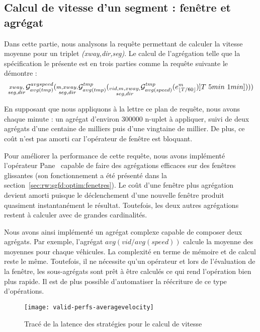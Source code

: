 \subsection{Calcul de vitesse d'un segment : fenêtre et agrégat}
Dans cette partie, nous analysons la requête permettant de calculer la vitesse moyenne pour un triplet \textit{(xway,dir,seg)}. Le calcul de l'agrégation telle que la spécification le présente est en trois parties comme la requête suivante le démontre :
$$\null_{\substack{xway,\\ seg,dir}}\G_{avg(tmp)}^{avgspeed}(\null_{\substack{m,xway,\\ seg,dir}}\G_{avg(tmp)}^{tmp}(\null_{\substack{vid,m,xway,\\ seg,dir}}\G_{avg(speed)}^{tmp} (e_{\lfloor T/60 \rfloor}^{m})]T\ 5min\ 1min])))$$

En supposant que nous appliquons à la lettre ce plan de requête, nous avons chaque minute : un agrégat d'environ 300000 n-uplet à appliquer, suivi de deux agrégats d'une centaine de milliers puis d'une vingtaine de millier. De plus, ce coût n'est pas amorti car l'opérateur de fenêtre est bloquant.

Pour améliorer la performance de cette requête, nous avons implémenté l'opérateur Pane~\cite{Li:pane} capable de faire des agrégations efficaces sur des fenêtres glissantes (son fonctionnement a été présenté dans la section~\ref{sec:rw:sgfd:optim:fenetres}). Le coût d'une fenêtre plus agrégation devient amorti puisque le déclenchement d'une nouvelle fenêtre produit quasiment instantanément le résultat. Toutefois, les deux autres agrégations restent à calculer avec de grandes cardinalités.

Nous avons ainsi implémenté un agrégat complexe capable de composer deux agrégats. Par exemple, l'agrégat $avg(vid/avg(speed))$ calcule la moyenne des moyennes pour chaque véhicules. La complexité en terme de mémoire et de calcul reste le même. Toutefois, il ne nécessite qu'un opérateur et lors de l'évaluation de la fenêtre, les sous-agrégats sont prêt à être calculés ce qui rend l'opération bien plus rapide. Il est de plus possible d'automatiser la réécriture de ce type d'opérations.

\begin{figure}[ht]
\centering
\texttt{[image: valid-perfs-averagevelocity]}
\caption{Tracé de la latence des stratégies pour le calcul de vitesse}\label{fig:valid:perfs:averagevelocity}
\end{figure}

